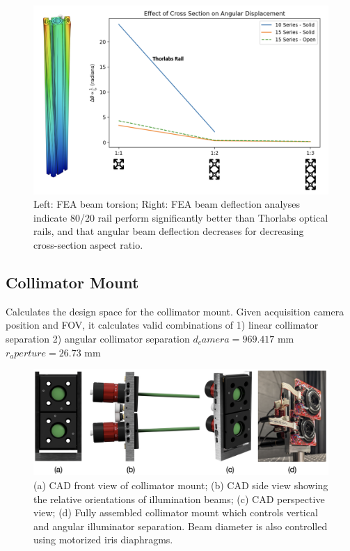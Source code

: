 %
\begin{figure}
    \centering
    \includegraphics[width=0.75\linewidth]{../figures/beam_torsion.png}
    \caption{Left: FEA beam torsion; Right: FEA beam deflection analyses indicate 80/20 rail perform significantly better than Thorlabs optical rails, and that angular beam deflection decreases for decreasing cross-section aspect ratio.}
    \label{fig:beam_torsion}
\end{figure}


\subsection{Collimator Mount}
Calculates the design space for the collimator mount.
Given acquisition camera position and FOV, it calculates valid combinations of 
    1) linear collimator separation
    2) angular collimator separation
$d_camera = 969.417$ mm
$r_aperture = 26.73$ mm

\begin{figure}
    \centering
    \includegraphics[width=\linewidth]{../figures/collimator_assembly_summary.png}
    \caption{(a) CAD front view of collimator mount; (b) CAD side view showing the relative orientations of illumination beams; (c) CAD perspective view; (d) Fully assembled collimator mount which controls vertical and angular illuminator separation. Beam diameter is also controlled using motorized iris diaphragms.}
    \label{fig:collimator_mount}
\end{figure}

